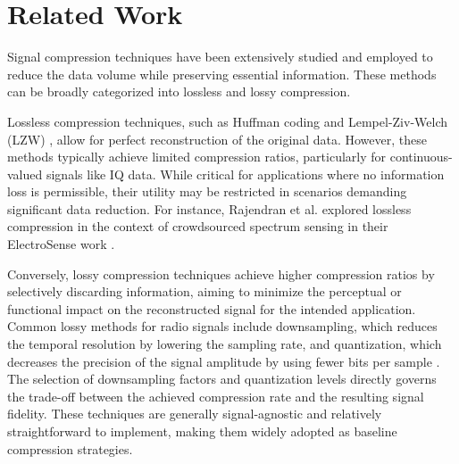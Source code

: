 \documentclass[sigconf, 10pt, nonacm, anonymous]{acmart}  %
\newcommand{\matthias}[1]{{\color{purple}[Matthias: #1]}}
\begin{document}

\section{Related Work}
Signal compression techniques have been extensively studied and employed to reduce the data volume while preserving essential information. These methods can be broadly categorized into lossless and lossy compression.

Lossless compression techniques, such as Huffman coding and Lempel-Ziv-Welch (LZW) \cite{sayood_info_theory}, allow for perfect reconstruction of the original data. However, these methods typically achieve limited compression ratios, particularly for continuous-valued signals like IQ data. While critical for applications where no information loss is permissible, their utility may be restricted in scenarios demanding significant data reduction. For instance, Rajendran et al. explored lossless compression in the context of crowdsourced spectrum sensing in their ElectroSense work \cite{rajendran2017electrosense}.

Conversely, lossy compression techniques achieve higher compression ratios by selectively discarding information, aiming to minimize the perceptual or functional impact on the reconstructed signal for the intended application. Common lossy methods for radio signals include downsampling, which reduces the temporal resolution by lowering the sampling rate, and quantization, which decreases the precision of the signal amplitude by using fewer bits per sample \cite{oppenheim_signals}. The selection of downsampling factors and quantization levels directly governs the trade-off between the achieved compression rate and the resulting signal fidelity. These techniques are generally signal-agnostic and relatively straightforward to implement, making them widely adopted as baseline compression strategies.
\end{document}
